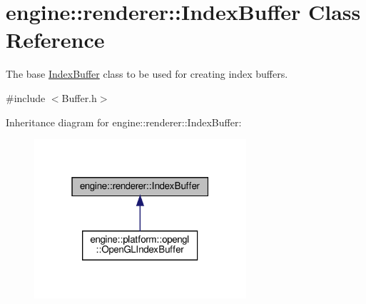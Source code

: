 \hypertarget{classengine_1_1renderer_1_1IndexBuffer}{}\section{engine\+:\+:renderer\+:\+:Index\+Buffer Class Reference}
\label{classengine_1_1renderer_1_1IndexBuffer}


The base \hyperlink{classengine_1_1renderer_1_1IndexBuffer}{Index\+Buffer} class to be used for creating index buffers.  




{\ttfamily \#include $<$Buffer.\+h$>$}



Inheritance diagram for engine\+:\+:renderer\+:\+:Index\+Buffer\+:\nopagebreak
\begin{figure}[H]
\begin{center}
\leavevmode
\includegraphics[width=223pt]{classengine_1_1renderer_1_1IndexBuffer__inherit__graph}
\end{center}
\end{figure}
